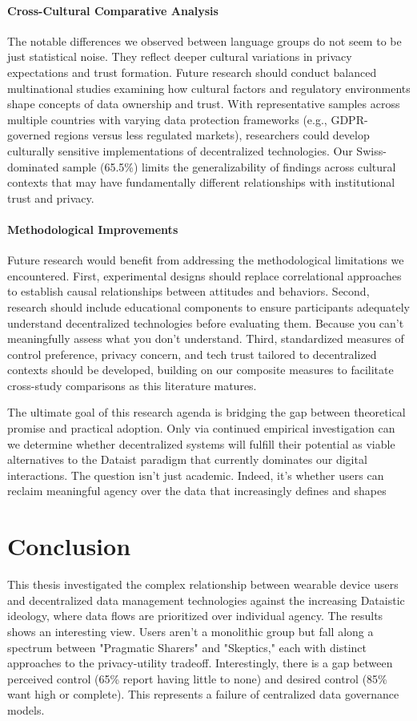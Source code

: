 	\paragraph{Cross-Cultural Comparative Analysis}
	The notable differences we observed between language groups do not seem to be just statistical noise. They reflect deeper cultural variations in privacy expectations and trust formation. Future research should conduct balanced multinational studies examining how cultural factors and regulatory environments shape concepts of data ownership and trust. With representative samples across multiple countries with varying data protection frameworks (e.g., GDPR-governed regions versus less regulated markets), researchers could develop culturally sensitive implementations of decentralized technologies. Our Swiss-dominated sample (65.5\%) limits the generalizability of findings across cultural contexts that may have fundamentally different relationships with institutional trust and privacy.
	
	\paragraph{Methodological Improvements}
	Future research would benefit from addressing the methodological limitations we encountered. First, experimental designs should replace correlational approaches to establish causal relationships between attitudes and behaviors. Second, research should include educational components to ensure participants adequately understand decentralized technologies before evaluating them. Because you can't meaningfully assess what you don't understand. Third, standardized measures of control preference, privacy concern, and tech trust tailored to decentralized contexts should be developed, building on our composite measures to facilitate cross-study comparisons as this literature matures.
	
	The ultimate goal of this research agenda is bridging the gap between theoretical promise and practical adoption. Only via  continued empirical investigation can we determine whether decentralized systems will fulfill their potential as viable alternatives to the Dataist paradigm that currently dominates our digital interactions. The question isn't just academic. Indeed, it's whether users can reclaim meaningful agency over the data that increasingly defines and shapes

\section{Conclusion}
This thesis investigated the complex relationship between wearable device users and decentralized data management technologies against the increasing Dataistic ideology, where data flows are prioritized over individual agency. The results shows an interesting view. Users aren't a monolithic group but fall along a spectrum between "Pragmatic Sharers" and "Skeptics," each with distinct approaches to the privacy-utility tradeoff. Interestingly, there is a gap between perceived control (65\% report having little to none) and desired control (85\% want high or complete). This represents a failure of centralized data governance models.

